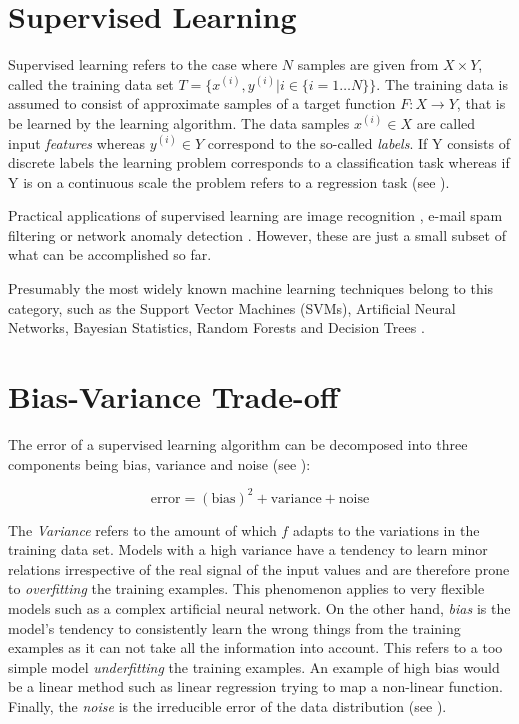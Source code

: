 \section{Supervised Learning}

Supervised learning refers to the case where $N$ samples are given from $X \times Y$, called the training data set  $T = \{ x^{(i)}, y^{(i)} | i \in \{i=1 \dots N\} \}$. The training data is assumed to consist of approximate samples of a target function $F: X \rightarrow Y$, that is be learned by the learning algorithm. The data samples $x^{(i)} \in X$ are called input \textit{features} whereas $y^{(i)} \in Y$ correspond to the so-called \textit{labels}. If Y consists of discrete labels the learning problem corresponds to a classification task whereas if Y is on a continuous scale the problem refers to a regression task (see \cite{Marsland:2009:MLA:1571643}).

Practical applications of supervised learning are image recognition \cite{simonyan2014very, lecun1990handwritten}, e-mail spam filtering \cite{guzella2009review} or network anomaly detection \cite{lee2010uncovering}. However, these are just a small subset of what can be accomplished so far.

Presumably the most widely known machine learning techniques belong to this category, such as the Support Vector Machines (SVMs), Artificial Neural Networks, Bayesian Statistics, Random Forests and Decision Trees \cite{Duda:2000:PC:954544}.

\section{Bias-Variance Trade-off}
The error of a supervised learning algorithm can be decomposed into three components being bias, variance and noise (see \cite{efron_hastie_2016}):

\begin{equation}
  \text{error} = (\text{bias})^2 + \text{variance} + \text{noise}
\end{equation}

The \textit{Variance} refers to the amount of which $f$ adapts to the variations in the training data set. Models with a high variance have a tendency to learn minor relations irrespective of the real signal of the input values and are therefore prone to \textit{overfitting} the training examples. This phenomenon applies to very flexible models such as a complex artificial neural network. On the other hand, \textit{bias} is the model's tendency to consistently learn the wrong things from the training examples as it can not take all the information into account. This refers to a too simple model \textit{underfitting} the training examples. An example of high bias would be a linear method such as linear regression trying to map a non-linear function. Finally, the \textit{noise} is the irreducible error of the data distribution (see \cite{James:2014:ISL:2517747}).

